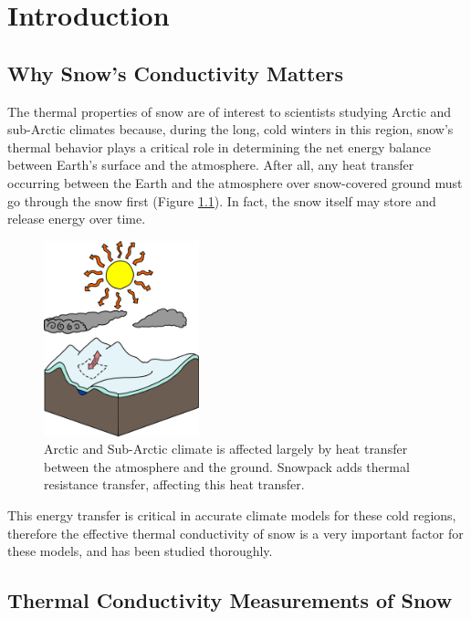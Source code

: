 \chapter{Introduction}
\label{sec:introduction}
\bigskip

\section{Why Snow's Conductivity Matters}

The thermal properties of snow are of interest to scientists studying Arctic and
sub-Arctic climates because, during the long, cold winters in this region,
snow's thermal behavior plays a critical role in determining the net energy
balance between Earth's surface and the atmosphere. After all, any heat transfer
occurring between the Earth and the atmosphere over snow-covered ground must go
through the snow first (Figure \ref{fig:climate}). In fact, the snow
itself may store and release energy over time.

\begin{figure}[h]
\centering
\includegraphics[width=0.4\textwidth]{fig/climate.png}
\caption{Arctic and Sub-Arctic climate is affected largely by heat transfer
between the atmosphere and the ground. Snowpack adds thermal resistance
transfer, affecting this heat transfer.}
\label{fig:climate}
\end{figure}

This energy transfer is critical in accurate climate models for these cold
regions, therefore the effective thermal conductivity of snow is a very
important factor for these models, and has been studied thoroughly. \cite{sturm1,sturm2,sturm3}

\section{Thermal Conductivity Measurements of Snow}

